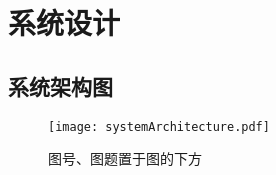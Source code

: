 
\chapter{系统设计}

\section{系统架构图}

\begin{figure}[h]
  \centering
  \texttt{[image: systemArchitecture.pdf]}
  \caption{图号、图题置于图的下方}
  \label{fig:systemArchitecture}
\end{figure}